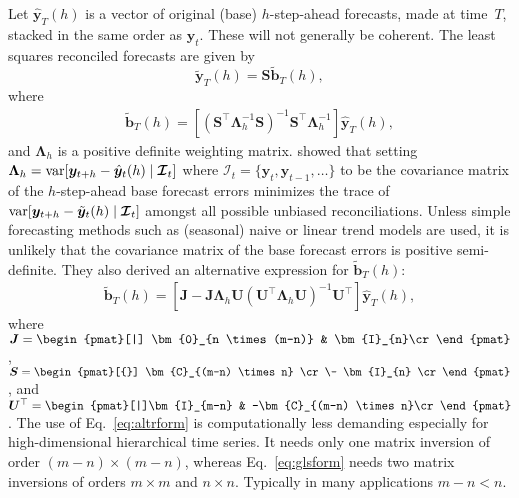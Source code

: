 \documentclass[twocolumn]{svjour3}
\newcommand{\var}{\textnormal{var}}
\newcommand{\bS}{\bm{S}}
\newcommand{\bC}{\bm{C}}
\newcommand{\bI}{\bm{I}}
\begin{document}
Let $\hat{\bm{y}}_T(h)$ is a vector of original (base) $h$-step-ahead forecasts, made at time~$T$, stacked in the same order as $\bm{y}_t$. These will not generally be coherent. The least squares reconciled forecasts are given by
$$
\tilde{\bm{y}}_{T}(h) = \bm{S}\tilde{\bm{b}}_{T}(h),
$$
where
\begin{align}
\tilde{\bm{b}}_{T}(h) = \left[(\bm{S}^\top\bm{\Lambda}_{h}^{-1}\bm{S})^{-1}\bm{S}^\top\bm{\Lambda}_{h}^{-1}\right]\hat{\bm{y}}_{T}(h),
\label{eq:glsform}
\end{align}
and $\bm{\Lambda}_h$ is a positive definite weighting matrix. \citet{Wick2018} showed that setting $\bm{\Lambda}_h =\var[\bm{y}_{t+h} - \hat{\bm{y}}_{t}(h)\mid\bm{\mathcal{I}}_{t}]$ where $\bm{\mathcal{I}}_t = \{\bm{y}_{t}, \bm{y}_{t-1}, \dots \}$ to be the covariance matrix of the $h$-step-ahead base forecast errors minimizes the trace of
$\var[\bm{y}_{t+h} - \tilde{\bm{y}}_{t}(h)\mid \bm{\mathcal{I}}_{t}]$ amongst all possible unbiased reconciliations. Unless simple forecasting methods such as (seasonal) naive or linear trend models are used, it is unlikely that the covariance matrix of the base forecast errors is positive semi-definite. They also derived an alternative expression for $\tilde{\bm{b}}_{T}(h)$:
\begin{align}
\tilde{\bm{b}}_{T}(h) = \left[\bm{J} - \bm{J}\bm{\Lambda}_h\bm{U}(\bm{U}^\top\bm{\Lambda}_h\bm{U})^{-1}\bm{U}^\top\right]\hat{\bm{y}}_{T}(h),
\label{eq:altrform}
\end{align}
where $\bm{J} = \begin{pmat}[|] \bm{0}_{n \times (m-n)} & \bI_{n}\cr\end{pmat}$, $\bS = \begin{pmat}[{}]
\bC_{(m-n) \times n} \cr\-
\bI_{n} \cr
\end{pmat}$, and $\bm{U}^\top = \begin{pmat}[|]\bI_{m-n}  & -\bC_{(m-n) \times n}\cr\end{pmat}$. The use of Eq.~\eqref{eq:altrform} is computationally less demanding especially for high-dimensional hierarchical time series. It needs only one matrix inversion of order $(m - n) \times (m - n)$, whereas Eq.~\eqref{eq:glsform} needs two matrix inversions of orders $m \times m$ and $n \times n$. Typically in many applications $m-n < n$.
\end{document}
